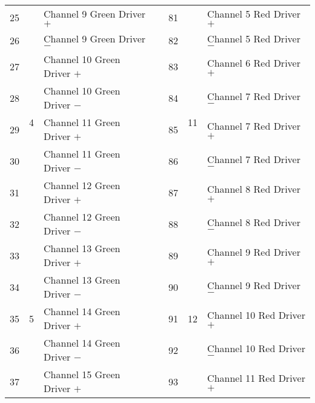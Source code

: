 \documentclass[]{article}
\begin{document}
\begin{table}[]
\begin{tabular}{@{}lllllll@{}}
		25           & \multirow{8}{*}{4} & Channel 9 Green Driver $+$    &                   & 81           & \multirow{8}{*}{11} & Channel 5 Red Driver $+$     \\
		26           &                    & Channel 9 Green Driver $-$    &                   & 82           &                     & Channel 5 Red Driver $-$     \\
		27           &                    & Channel 10 Green Driver $+$   &                   & 83           &                     & Channel 6 Red Driver $+$     \\
		28           &                    & Channel 10 Green Driver $-$   &                   & 84           &                     & Channel 7 Red Driver $-$     \\
		29           &                    & Channel 11 Green Driver $+$   &                   & 85           &                     & Channel 7 Red Driver $+$     \\
		30           &                    & Channel 11 Green Driver $-$   &                   & 86           &                     & Channel 7 Red Driver $-$     \\
		31           &                    & Channel 12 Green Driver $+$   &                   & 87           &                     & Channel 8 Red Driver $+$     \\
		32           &                    & Channel 12 Green Driver $-$   &                   & 88           &                     & Channel 8 Red Driver $-$     \\ \cmidrule(r){1-3} \cmidrule(l){5-7} 
		33           & \multirow{8}{*}{5} & Channel 13 Green Driver $+$   &                   & 89           & \multirow{8}{*}{12} & Channel 9 Red Driver $+$     \\
		34           &                    & Channel 13 Green Driver $-$   &                   & 90           &                     & Channel 9 Red Driver $-$     \\
		35           &                    & Channel 14 Green Driver $+$   &                   & 91           &                     & Channel 10 Red Driver $+$    \\
		36           &                    & Channel 14 Green Driver $-$   &                   & 92           &                     & Channel 10 Red Driver $-$    \\
		37           &                    & Channel 15 Green Driver $+$   &                   & 93           &                     & Channel 11 Red Driver $+$    \\

\end{tabular}
\end{table}
\end{document}
